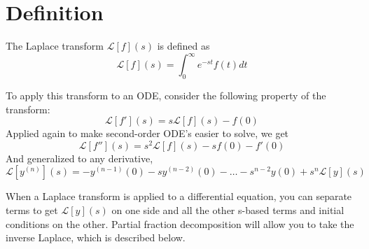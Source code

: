 \documentclass[11pt]{article}
\newcommand{\Lagr}{\mathcal{L}}
\begin{document}
\section{Definition}
	The Laplace transform $\Lagr[f](s)$ is defined as
	\begin{equation}
		\Lagr[f](s) = \int_0^\infty e^{-st} f(t) dt
	\end{equation}
	
	To apply this transform to an ODE, consider the following property of the transform:
	\begin{equation}
		\Lagr[f'](s) = s\Lagr[f](s) - f(0)
	\end{equation}
	Applied again to make second-order ODE's easier to solve, we get
	\begin{equation}
		\Lagr[f''](s) = s^2\Lagr[f](s) - sf(0) - f'(0)
	\end{equation}
	And generalized to any derivative,
	\begin{equation}
		\Lagr[y^{(n)}](s) = -y^{(n-1)}(0) - sy^{(n-2)}(0) - \ldots -s^{n-2}y(0) + s^n\Lagr[y](s)
	\end{equation}
	
	When a Laplace transform is applied to a differential equation, you can separate terms to get $\Lagr[y](s)$ on one side and all the other s-based terms and initial conditions on the other. Partial fraction decomposition will allow you to take the inverse Laplace, which is described below.
	
\end{document}
